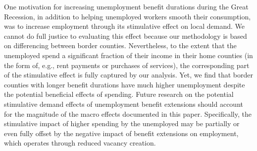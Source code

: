 \documentclass[12pt]{article}
\newcommand{\1}{\mathbf{1}}
\begin{document}
One motivation for increasing unemployment benefit durations during the Great Recession, in addition to helping unemployed workers smooth their consumption, was to increase employment through its stimulative effect on local demand. We cannot do full justice to evaluating this effect because our methodology is based on differencing between border counties. Nevertheless, to the extent that the unemployed spend a significant fraction of their income in their home counties (in the form of, e.g., rent payments or purchases of services), the corresponding part of the stimulative effect is fully captured by our analysis. Yet, we find that border counties with longer benefit durations have much higher unemployment despite the potential beneficial effects of spending. Future research on the potential stimulative demand effects of unemployment benefit extensions should account for the magnitude of the macro effects documented in this paper. Specifically, the stimulative impact of higher spending by the unemployed may be partially or even fully offset by the negative impact of benefit extensions on employment, which operates through reduced vacancy creation.


\singlespacing
%


\pagebreak
\end{document}
